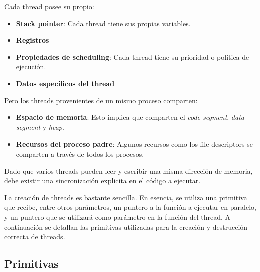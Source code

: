 \documentclass[oneside]{article}
\begin{document}
		Cada thread posee su propio:
		\begin{itemize}
			\item \textbf{Stack pointer}: Cada thread tiene sus propias variables.
			\item \textbf{Registros}
			\item \textbf{Propiedades de scheduling}: Cada thread tiene su prioridad o política de ejecución.
			\item \textbf{Datos específicos del thread}
		\end{itemize}

		Pero los threads provenientes de un mismo proceso comparten:
		\begin{itemize}
			\item \textbf{Espacio de memoria}: Esto implica que comparten el \emph{code segment}, \emph{data segment} y \emph{heap}.
			\item \textbf{Recursos del proceso padre}: Algunos recursos como los file descriptors se comparten a través de todos los procesos.
		\end{itemize}

		Dado que varios threads pueden leer y escribir una misma dirección de memoria, debe existir una sincronización explicita en el código a ejecutar.

		La creación de threads es bastante sencilla. En esencia, se utiliza una primitiva que recibe, entre otros parámetros, un puntero a la función a ejecutar en paralelo, y un puntero que se utilizará como parámetro en la función del thread. A continuación se detallan las primitivas utilizadas para la creación y destrucción correcta de threads.

		\subsection{Primitivas}
\end{document}
